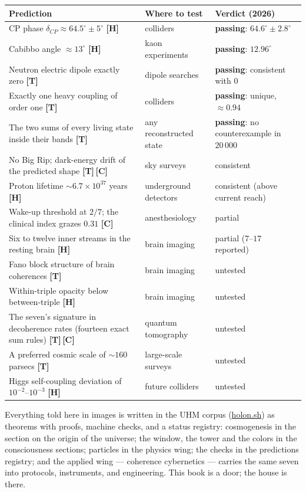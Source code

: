 \documentclass[11pt,letterpaper]{article}
\newcommand{\stT}{\textbf{[T]}\xspace}
\newcommand{\stC}{\textbf{[C]}\xspace}
\newcommand{\stH}{\textbf{[H]}\xspace}
\newcommand{\holonsh}{\href{https://holon.sh}{holon.sh}\xspace}
\begin{document}
\begin{center}\small
\begin{tabular}{@{}p{}p{}p{}@{}}
\toprule
\textbf{Prediction} & \textbf{Where to test} & \textbf{Verdict (2026)} \\
\midrule
CP phase $\delta_{CP}\approx 64.5^\circ\pm5^\circ$ \stH &
colliders & \textbf{passing}: $64.6^\circ\pm2.8^\circ$ \\[2pt]
Cabibbo angle $\approx 13^\circ$ \stH & kaon experiments &
\textbf{passing}: $12.96^\circ$ \\[2pt]
Neutron electric dipole exactly zero \stT & dipole searches &
\textbf{passing}: consistent with $0$ \\[2pt]
Exactly one heavy coupling of order one \stT & colliders &
\textbf{passing}: unique, $\approx 0.94$ \\[2pt]
The two sums of every living state inside their bands \stT & any
reconstructed state & \textbf{passing}: no counterexample in
$20\,000$ \\[2pt]
No Big Rip; dark-energy drift of the predicted shape \stT\,\stC &
sky surveys & consistent \\[2pt]
Proton lifetime $\sim 6.7\times10^{37}$ years \stH & underground
detectors & consistent (above current reach) \\[2pt]
Wake-up threshold at $2/7$; the clinical index grazes $0.31$ \stC &
anesthesiology & partial \\[2pt]
Six to twelve inner streams in the resting brain \stH & brain
imaging & partial ($7$--$17$ reported) \\[2pt]
Fano block structure of brain coherences \stT & brain imaging &
untested \\[2pt]
Within-triple opacity below between-triple \stH & brain imaging &
untested \\[2pt]
The seven's signature in decoherence rates (fourteen exact sum
rules) \stT\,\stC & quantum tomography & untested \\[2pt]
A preferred cosmic scale of $\sim 160$ parsecs \stT & large-scale
surveys & untested \\[2pt]
Higgs self-coupling deviation of $10^{-2}$--$10^{-3}$ \stH &
future colliders & untested \\
\bottomrule
\end{tabular}
\end{center}

\vfill
\begin{factbox}
Everything told here in images is written in the UHM corpus
(\holonsh) as theorems with proofs, machine checks, and a status
registry: cosmogenesis in the section on the origin of the universe;
the window, the tower and the colors in the consciousness sections;
particles in the physics wing; the checks in the predictions
registry; and the applied wing --- coherence cybernetics --- carries
the same seven into protocols, instruments, and engineering. This
book is a door; the house is there.
\end{factbox}
\end{document}
